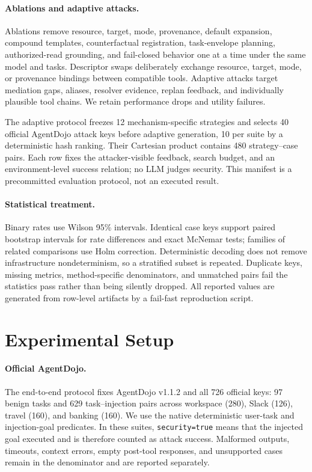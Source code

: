 \documentclass[letterpaper,twocolumn,10pt]{article}
\begin{document}
\paragraph{Ablations and adaptive attacks.}
Ablations remove resource, target, mode, provenance, default expansion, compound templates, counterfactual registration, task-envelope planning, authorized-read grounding, and fail-closed behavior one at a time under the same model and tasks. Descriptor swaps deliberately exchange resource, target, mode, or provenance bindings between compatible tools. Adaptive attacks target mediation gaps, aliases, resolver evidence, replan feedback, and individually plausible tool chains. We retain performance drops and utility failures.

The adaptive protocol freezes 12 mechanism-specific strategies and selects 40 official AgentDojo attack keys before adaptive generation, 10 per suite by a deterministic hash ranking. Their Cartesian product contains 480 strategy--case pairs. Each row fixes the attacker-visible feedback, search budget, and an environment-level success relation; no LLM judges security. This manifest is a precommitted evaluation protocol, not an executed result.

\paragraph{Statistical treatment.}
Binary rates use Wilson 95\% intervals. Identical case keys support paired bootstrap intervals for rate differences and exact McNemar tests; families of related comparisons use Holm correction. Deterministic decoding does not remove infrastructure nondeterminism, so a stratified subset is repeated. Duplicate keys, missing metrics, method-specific denominators, and unmatched pairs fail the statistics pass rather than being silently dropped. All reported values are generated from row-level artifacts by a fail-fast reproduction script.
 \section{Experimental Setup}

\paragraph{Official AgentDojo.}
The end-to-end protocol fixes AgentDojo v1.1.2 and all 726 official keys: 97 benign tasks and 629 task--injection pairs across workspace (280), Slack (126), travel (160), and banking (160). We use the native deterministic user-task and injection-goal predicates. In these suites, \texttt{security=true} means that the injected goal executed and is therefore counted as attack success. Malformed outputs, timeouts, context errors, empty post-tool responses, and unsupported cases remain in the denominator and are reported separately.
\end{document}
